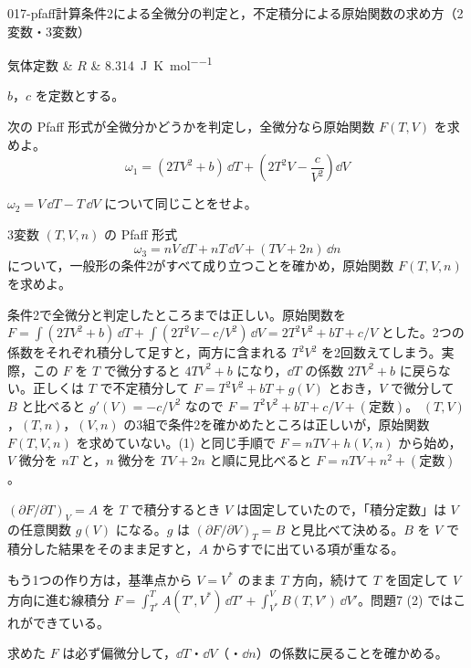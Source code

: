 \documentclass[uplatex,dvipdfmx,a4paper,11pt]{jsarticle}
\begin{document}
\mondaihen
{}
\begin{mondai}{017-pfaff}{計算}{条件2による全微分の判定と，不定積分による原始関数の求め方（2変数・3変数）}
\begin{teisuu}
  気体定数 & $R$ & \qty{8.314}{\joule\per\kelvin\per\mole}\\
\end{teisuu}
$b$，$c$ を定数とする。
  \begin{shoumon}
    \item 次の Pfaff 形式が全微分かどうかを判定し，全微分なら原始関数 $F(T,V)$ を求めよ。
    \[ \omega_{1} = (2TV^{2} + b)\,\dd T + \left(2T^{2}V - \frac{c}{V^{2}}\right)\dd V \]
    \item $\omega_{2} = V\,\dd T - T\,\dd V$ について同じことをせよ。
    \item 3変数 $(T,V,n)$ の Pfaff 形式
    \[ \omega_{3} = nV\,\dd T + nT\,\dd V + (TV + 2n)\,\dd n \]
    について，一般形の条件2がすべて成り立つことを確かめ，原始関数 $F(T,V,n)$ を求めよ。
  \end{shoumon}

\begin{kotaeran}
   条件2で全微分と判定したところまでは正しい。原始関数を $F=\int(2TV^{2}+b)\,\dd T+\int(2T^{2}V-c/V^{2})\,\dd V=2T^{2}V^{2}+bT+c/V$ とした。2つの係数をそれぞれ積分して足すと，両方に含まれる $T^{2}V^{2}$ を2回数えてしまう。実際，この $F$ を $T$ で微分すると $4TV^{2}+b$ になり，$\dd T$ の係数 $2TV^{2}+b$ に戻らない。正しくは $T$ で不定積分して $F=T^{2}V^{2}+bT+g(V)$ とおき，$V$ で微分して $B$ と比べると $g'(V)=-c/V^{2}$ なので $F=T^{2}V^{2}+bT+c/V+(\text{定数})$。
   $(T,V)$，$(T,n)$，$(V,n)$ の3組で条件2を確かめたところは正しいが，原始関数 $F(T,V,n)$ を求めていない。(1) と同じ手順で $F=nTV+h(V,n)$ から始め，$V$ 微分を $nT$ と，$n$ 微分を $TV+2n$ と順に見比べると $F=nTV+n^{2}+(\text{定数})$。
\end{kotaeran}
\begin{rikai}
  \item $(\partial F/\partial T)_{V}=A$ を $T$ で積分するとき $V$ は固定していたので，「積分定数」は $V$ の任意関数 $g(V)$ になる。$g$ は $(\partial F/\partial V)_{T}=B$ と見比べて決める。$B$ を $V$ で積分した結果をそのまま足すと，$A$ からすでに出ている項が重なる。
  \item もう1つの作り方は，基準点から $V=V^{*}$ のまま $T$ 方向，続けて $T$ を固定して $V$ 方向に進む線積分 $F=\int_{T^{*}}^{T}A(T',V^{*})\,\dd T'+\int_{V^{*}}^{V}B(T,V')\,\dd V'$。問題7 (2) ではこれができている。
  \item 求めた $F$ は必ず偏微分して，$\dd T$・$\dd V$（・$\dd n$）の係数に戻ることを確かめる。
\end{rikai}
\end{mondai}
\end{document}
